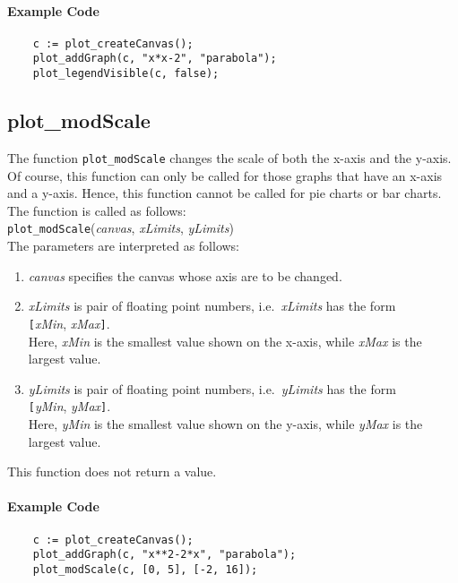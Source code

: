 \paragraph{Example Code}
\begin{verbatim}
    c := plot_createCanvas();
    plot_addGraph(c, "x*x-2", "parabola");
    plot_legendVisible(c, false);
\end{verbatim}

\subsection{plot\_modScale}
The function \texttt{plot\_modScale} changes the scale of both the x-axis and the y-axis.
Of course, this function can only be called for those graphs that have an x-axis and a y-axis.
Hence, this function cannot be called for pie charts or bar charts.
The function is called as follows:
\\[0.2cm]
\hspace*{1.3cm}
\texttt{plot\_modScale}(\textsl{canvas}, \textsl{xLimits}, \textsl{yLimits})
\\[0.2cm]
The parameters are interpreted as follows:
\begin{enumerate}
\item \textsl{canvas} specifies the canvas whose axis are to be changed.
\item \textsl{xLimits} is pair of floating point numbers, i.e.~\textsl{xLimits} has the form
      \\[0.2cm]
      \hspace*{1.3cm}
      \texttt{[}\textsl{xMin}, \textsl{xMax}\texttt{]}.
      \\[0.2cm]
      Here, \textsl{xMin} is the smallest value shown on the x-axis, while \textsl{xMax} is the
      largest value.
\item \textsl{yLimits} is pair of floating point numbers, i.e.~\textsl{yLimits} has the form
      \\[0.2cm]
      \hspace*{1.3cm}
      \texttt{[}\textsl{yMin}, \textsl{yMax}\texttt{]}.
      \\[0.2cm]
      Here, \textsl{yMin} is the smallest value shown on the y-axis, while \textsl{yMax} is the
      largest value.
\end{enumerate}
This function does not return a value.

\paragraph{Example Code}
\begin{verbatim}
    c := plot_createCanvas();
    plot_addGraph(c, "x**2-2*x", "parabola");
    plot_modScale(c, [0, 5], [-2, 16]);
\end{verbatim}

